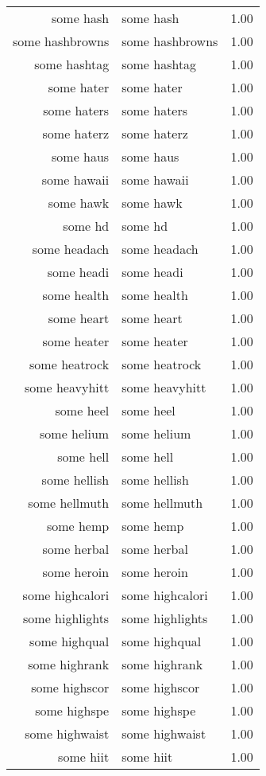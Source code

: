 \begin{table}[ht]
\begin{tabular}{rlr}
  some hash & some hash & 1.00 \\ 
  some hashbrowns & some hashbrowns & 1.00 \\ 
  some hashtag & some hashtag & 1.00 \\ 
  some hater & some hater & 1.00 \\ 
  some haters & some haters & 1.00 \\ 
  some haterz & some haterz & 1.00 \\ 
  some haus & some haus & 1.00 \\ 
  some hawaii & some hawaii & 1.00 \\ 
  some hawk & some hawk & 1.00 \\ 
  some hd & some hd & 1.00 \\ 
  some headach & some headach & 1.00 \\ 
  some headi & some headi & 1.00 \\ 
  some health & some health & 1.00 \\ 
  some heart & some heart & 1.00 \\ 
  some heater & some heater & 1.00 \\ 
  some heatrock & some heatrock & 1.00 \\ 
  some heavyhitt & some heavyhitt & 1.00 \\ 
  some heel & some heel & 1.00 \\ 
  some helium & some helium & 1.00 \\ 
  some hell & some hell & 1.00 \\ 
  some hellish & some hellish & 1.00 \\ 
  some hellmuth & some hellmuth & 1.00 \\ 
  some hemp & some hemp & 1.00 \\ 
  some herbal & some herbal & 1.00 \\ 
  some heroin & some heroin & 1.00 \\ 
  some highcalori & some highcalori & 1.00 \\ 
  some highlights & some highlights & 1.00 \\ 
  some highqual & some highqual & 1.00 \\ 
  some highrank & some highrank & 1.00 \\ 
  some highscor & some highscor & 1.00 \\ 
  some highspe & some highspe & 1.00 \\ 
  some highwaist & some highwaist & 1.00 \\ 
  some hiit & some hiit & 1.00 \\ 

\end{tabular}
\end{table}
